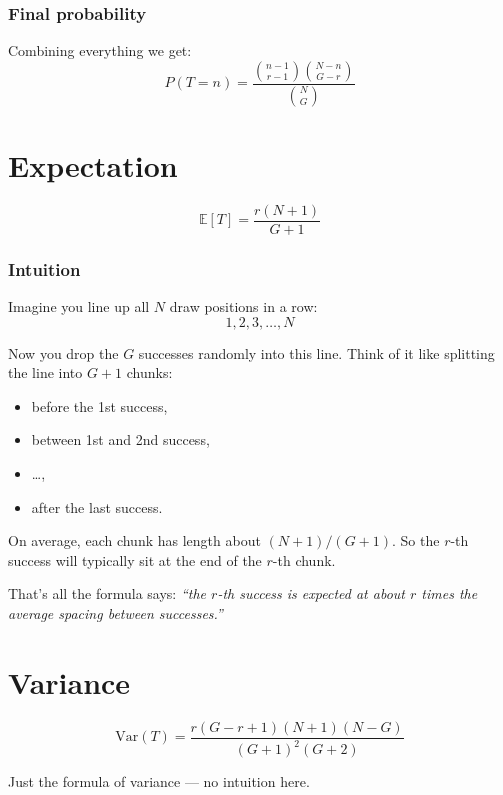 \documentclass[12pt]{article}
\begin{document}
\subsubsection*{Final probability}
Combining everything we get:
\begin{equation}
P(T = n) = \frac{\binom{n-1}{r-1}\binom{N-n}{G-r}}{\binom{N}{G}}
\end{equation}

\section*{Expectation}
\begin{equation}
\mathbb{E}[T] = \frac{r (N+1)}{G+1}
\end{equation}

\subsubsection*{Intuition}
Imagine you line up all $N$ draw positions in a row:
\[
1,2,3,\dots,N
\]

Now you drop the $G$ successes randomly into this line.  
Think of it like splitting the line into $G+1$ chunks:
\begin{itemize}
    \item before the 1st success,
    \item between 1st and 2nd success,
    \item \dots,
    \item after the last success.
\end{itemize}

On average, each chunk has length about $(N+1)/(G+1)$.  
So the $r$-th success will typically sit at the end of the $r$-th chunk.

That’s all the formula says:  
\textit{“the $r$-th success is expected at about $r$ times the average spacing between successes.”}

\section*{Variance}
\begin{equation}
\mathrm{Var}(T) = \frac{r(G-r+1)(N+1)(N-G)}{(G+1)^2(G+2)}
\end{equation}

Just the formula of variance --- no intuition here.
\end{document}
